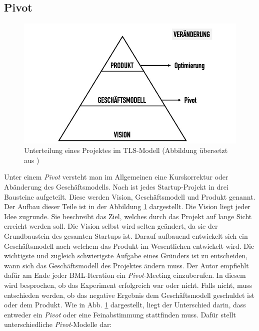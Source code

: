 \subsection*{\label{sec:LeanStartup-Pivot}\thesubsection\quad Pivot}
\begin{figure}
	\begin{center}
		\includegraphics[scale=0.5]{99_IMG/02_Grundlagen/visionStrategyProduct.jpg}
		\caption[Unterteilung eines Projektes im \ac{TLS}-Modell]{Unterteilung eines Projektes im \ac{TLS}-Modell (Abbildung übersetzt aus )}
		\label{fig:LeanStartup_VisionStrategyProduct}
	\end{center}
\end{figure}
Unter einem \textit{Pivot} versteht man im Allgemeinen eine Kurskorrektur oder Abänderung des Geschäftsmodells. Nach \citeauthor{TheLeanStartup} ist jedes Startup-Projekt in drei Bausteine aufgeteilt. Diese werden Vision, Geschäftsmodell und Produkt genannt. Der Aufbau dieser Teile ist in der Abbildung \ref{fig:LeanStartup_VisionStrategyProduct} dargestellt. 
Die Vision liegt jeder Idee zugrunde. Sie beschreibt das Ziel, welches durch das Projekt auf lange Sicht erreicht werden soll. Die Vision selbst wird selten geändert, da sie der Grundbaustein des gesamten Startups ist. Darauf aufbauend entwickelt sich ein Geschäftsmodell nach welchem das Produkt im Wesentlichen entwickelt wird. Die wichtigste und zugleich schwierigste Aufgabe eines Gründers ist zu entscheiden, wann sich das Geschäftsmodell des Projektes ändern muss. Der Autor empfiehlt dafür am Ende jeder \ac{BML}-Iteration ein \textit{Pivot}-Meeting einzuberufen. In diesem wird besprochen, ob das Experiment erfolgreich war oder nicht. Falls nicht, muss entschieden werden, ob das negative Ergebnis dem Geschäftsmodell geschuldet ist oder dem Produkt. Wie in Abb. \ref{fig:LeanStartup_VisionStrategyProduct} dargestellt, liegt der Unterschied darin, dass entweder ein \textit{Pivot} oder eine Feinabstimmung stattfinden muss. Dafür stellt \citeauthor{TheLeanStartup} unterschiedliche \textit{Pivot}-Modelle dar:
